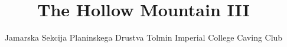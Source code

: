 \documentclass[symmetric, a4paper]{tufte-book}
\title{The Hollow Mountain III}
\author{Jamarska Sekcija Planinskega Drustva Tolmin Imperial College Caving Club}
\begin{document}
\maketitle %

\justify

\tableofcontents %
\listofsurveys
\listofmaps
\newpage




	

	
  	
	
 	
	
	
	

	
	
    \printindex
    \printindex[aut]

   
    
	\label{Bibliography}
	
	
	
        \clearpage
	
	
\end{document}
